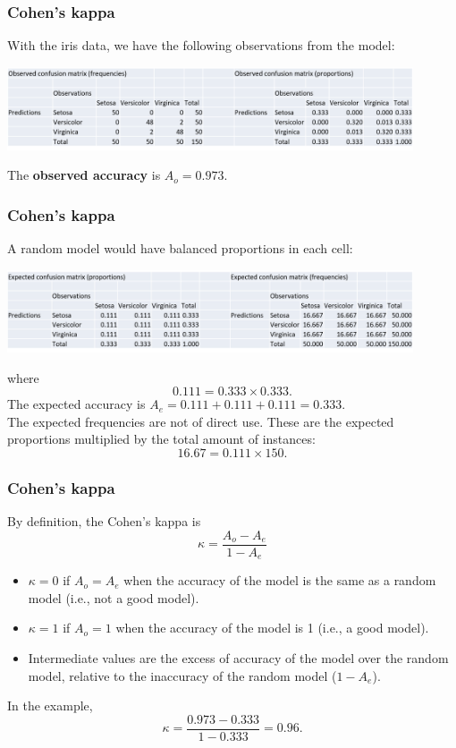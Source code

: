 \begin{frame}
\frametitle{Cohen's kappa}
With the iris data, we have the following observations from the model:
\begin{center}
\includegraphics[width=12cm]{../Graphs/Kappa_Obs.png}
\end{center}
The {\bf observed accuracy} is $A_o = 0.973$. 
\end{frame}
\begin{frame}
\frametitle{Cohen's kappa}
A random model would have balanced proportions in each cell:
\begin{center}
\includegraphics[width=12cm]{../Graphs/Kappa_Exp.png}
\end{center}
where 
$$
0.111 = 0.333\times 0.333.
$$
The expected accuracy is $A_e = 0.111+0.111+0.111 = 0.333$. \\
\vspace{0.3cm}
\scriptsize
The expected frequencies are not of direct use. These are the expected proportions multiplied by the total amount of instances:
$$
16.67 = 0.111 \times 150.
$$
\normalsize
\end{frame}
\begin{frame}
\frametitle{Cohen's kappa}
By definition, the Cohen's kappa is
$$
\kappa = \frac{A_o - A_e}{1-A_e} 
$$
\begin{itemize}
\item $\kappa = 0$ if $A_o=A_e$ when the accuracy of the model is the same as a random model (i.e., not a good model).
\item $\kappa = 1$ if $A_o=1$ when the accuracy of the model is 1 (i.e., a good model).
\item Intermediate values are the excess of accuracy of the model over the random model, relative to the inaccuracy of the random model ($1-A_e$).
\end{itemize}
In the example,
$$
\kappa =\frac{0.973 - 0.333}{1 - 0.333} = 0.96.
$$
\end{frame}
